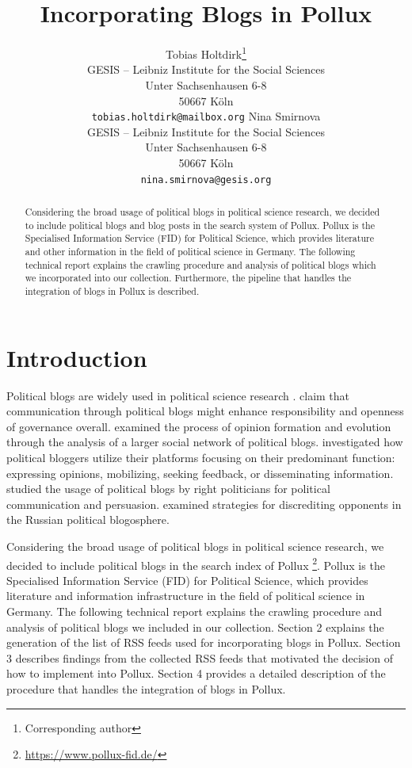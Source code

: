 \documentclass{article}
\title{Incorporating Blogs in Pollux}
\author{Tobias Holtdirk\thanks{Corresponding author}\\
	GESIS -- Leibniz Institute for the Social Sciences\\
	Unter Sachsenhausen 6-8 \\
    50667 Köln \\
	\texttt{tobias.holtdirk@mailbox.org}
    \And 
    Nina Smirnova\\
	GESIS -- Leibniz Institute for the Social Sciences\\
	Unter Sachsenhausen 6-8 \\
    50667 Köln \\
	\texttt{nina.smirnova@gesis.org}
}
\begin{document}
\maketitle

\begin{abstract}
	Considering the broad usage of political blogs in political science research, we decided to include political blogs and blog posts in the search system of Pollux. Pollux is the Specialised Information Service (FID) for Political Science, which provides literature and other information in the field of political science in Germany. The following technical report explains the crawling procedure and analysis of political blogs which we incorporated into our collection. Furthermore, the pipeline that handles the integration of blogs in Pollux is described.
\end{abstract}



\section{Introduction}
Political blogs are widely used in political science research \citep{wallsten_agenda_2007, coleman_political_2008, wallsten_political_2008, guner_political_2009, akinnubi_deliberative_2023, peng_role_2023}. \citet{coleman_political_2008} claim that communication through political blogs might enhance responsibility and openness of governance overall. \citet{peng_role_2023} examined the process of opinion formation and evolution through the analysis of a larger social network of political blogs. \citet{wallsten_political_2008} investigated how political bloggers utilize their platforms focusing on their predominant function: expressing opinions, mobilizing, seeking feedback, or disseminating information. \citet{demasi_analysing_2020} studied the usage of political blogs by right politicians for political communication and persuasion. \citet{balakhonskaya_communicative_2020} examined strategies for discrediting opponents in the Russian political blogosphere.

Considering the broad usage of political blogs in political science research, we decided to include political blogs in the search index of Pollux \footnote{\url{https://www.pollux-fid.de/}}. Pollux is the Specialised Information Service (FID) for Political Science, which provides literature and information infrastructure in the field of political science in Germany. The following technical report explains the crawling procedure and analysis of political blogs we included in our collection. Section 2 explains the generation of the list of RSS feeds used for incorporating blogs in Pollux. Section 3 describes findings from the collected RSS feeds that motivated the decision of how to implement into Pollux. Section 4 provides a detailed description of the procedure that handles the integration of blogs in Pollux.
\end{document}
